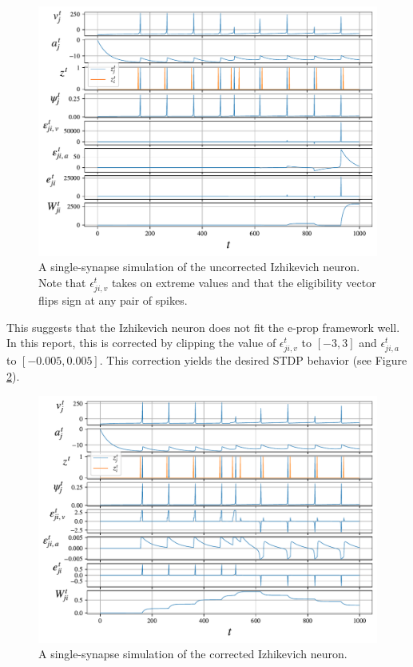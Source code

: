 		\begin{figure}[ht]
		    \centering
		    \includegraphics[width=\linewidth]{gfx/demo_izh}
		    \caption[Uncorrected Izhikevich neuron simulation]{A single-synapse simulation of the uncorrected Izhikevich neuron. Note that $\epsilon^t_{ji, v}$ takes on extreme values and that the eligibility vector flips sign at any pair of spikes.}
		    \label{fig:demo_izh}
		\end{figure}

	    This suggests that the Izhikevich neuron does not fit the e-prop framework well.
	    In this report, this is corrected by clipping the value of $\epsilon^t_{ji,v}$ to $\left[-3, 3\right]$ and $\epsilon^t_{ji,a}$ to $\left[-0.005, 0.005\right]$.
	    This correction yields the desired STDP behavior (see Figure \ref{fig:demo_izh_corrected}).

        \begin{figure}[ht]
            \centering
            \includegraphics[width=\linewidth]{gfx/demo_izh_corrected}
            \caption[Corrected Izhikevich neuron simulation]{A single-synapse simulation of the corrected Izhikevich neuron.}
            \label{fig:demo_izh_corrected}
        \end{figure}


